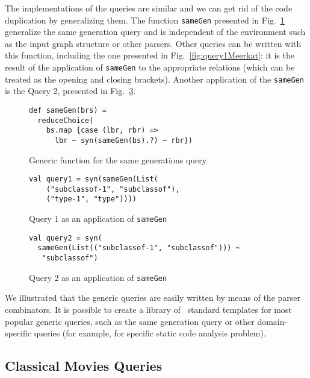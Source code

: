 The implementations of the queries are similar and we can get rid of the code duplication by generalizing them.
The function \lstinline{sameGen} presented in Fig.~\ref{fig:gen} generalize the same generation query and is independent of the environment such as the input graph structure or other parsers.
Other queries can be written with this function, including the one presented in Fig.~\ref{fig:query1Meerkat}: it is the result of the application of \lstinline{sameGen} to the appropriate relations (which can be treated as the opening and closing brackets).
Another application of the \lstinline{sameGen} is the Query 2, presented in Fig.~\ref{fig:query2Gen}.

\begin{figure}[h]
\begin{lstlisting}
def sameGen(brs) =
  reduceChoice(
    bs.map {case (lbr, rbr) =>
      lbr ~ syn(sameGen(bs).?) ~ rbr})
\end{lstlisting}
\caption{Generic function for the same generations query}
\label{fig:gen}
\end{figure}


\begin{figure}[h]
\begin{lstlisting}
val query1 = syn(sameGen(List(
    ("subclassof-1", "subclassof"),
    ("type-1", "type"))))
\end{lstlisting}
\caption{Query 1 as an application of \lstinline{sameGen}}
\label{fig:query1Gen}
\end{figure}


\begin{figure}[h]
\begin{lstlisting}
val query2 = syn(
  sameGen(List(("subclassof-1", "subclassof"))) ~
   "subclassof")
\end{lstlisting}
\caption{Query 2 as an application of \lstinline{sameGen}}
\label{fig:query2Gen}
\end{figure}


We illustrated that the generic queries are easily written by means of the parser combinators.
It is possible to create a library of \ standard templates for most popular generic queries, such as the same generation query or other domain-specific queries (for example, for specific static code analysis problem).


\subsection{Classical Movies Queries}

